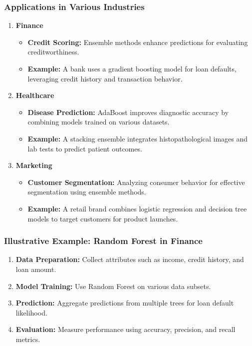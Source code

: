\documentclass[aspectratio=169]{beamer}
\begin{document}
\begin{frame}[fragile]
    \frametitle{Applications in Various Industries}
    \begin{enumerate}
        \item \textbf{Finance}
            \begin{itemize}
                \item \textbf{Credit Scoring:} Ensemble methods enhance predictions for evaluating creditworthiness.
                \item \textbf{Example:} A bank uses a gradient boosting model for loan defaults, leveraging credit history and transaction behavior.
            \end{itemize}
        \item \textbf{Healthcare}
            \begin{itemize}
                \item \textbf{Disease Prediction:} AdaBoost improves diagnostic accuracy by combining models trained on various datasets.
                \item \textbf{Example:} A stacking ensemble integrates histopathological images and lab tests to predict patient outcomes.
            \end{itemize}
        \item \textbf{Marketing}
            \begin{itemize}
                \item \textbf{Customer Segmentation:} Analyzing consumer behavior for effective segmentation using ensemble methods.
                \item \textbf{Example:} A retail brand combines logistic regression and decision tree models to target customers for product launches.
            \end{itemize}
    \end{enumerate}
\end{frame}

\begin{frame}[fragile]
    \frametitle{Illustrative Example: Random Forest in Finance}
    \begin{enumerate}
        \item \textbf{Data Preparation:} Collect attributes such as income, credit history, and loan amount.
        \item \textbf{Model Training:} Use Random Forest on various data subsets.
        \item \textbf{Prediction:} Aggregate predictions from multiple trees for loan default likelihood.
        \item \textbf{Evaluation:} Measure performance using accuracy, precision, and recall metrics.
    \end{enumerate}
\end{frame}
\end{document}
